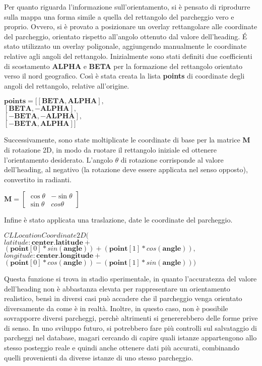 Per quanto riguarda l'informazione sull'orientamento, si è pensato di riprodurre 
sulla mappa una forma simile a quella del rettangolo del parcheggio vero e 
proprio. Ovvero, si è provato a posizionare un overlay rettangolare alle coordinate
del parcheggio, orientato rispetto all'angolo ottenuto dal valore dell'heading. 
\'E stato utilizzato un overlay poligonale, aggiungendo manualmente le coordinate
relative agli angoli del rettangolo. Inizialmente sono stati definiti due coefficienti 
di scostamento \textbf{ALPHA} e \textbf{BETA} per la formazione del rettangolo orientato 
verso il nord geografico. Così è stata creata la lista \textbf{points} di coordinate degli
angoli del rettangolo, relative all'origine. 
\begin{center}
    $ \textbf{points} = [[\textbf{BETA}, \textbf{ALPHA}],$\\
        $[\textbf{BETA}, -\textbf{ALPHA}],$\\
        $[-\textbf{BETA}, -\textbf{ALPHA}],$\\
        $[-\textbf{BETA}, \textbf{ALPHA}]] $
\end{center}
Successivamente, sono state moltiplicate le coordinate di base per la matrice \textbf{M} 
di rotazione 2D, in modo da ruotare il rettangolo iniziale ed ottenere 
l'orientamento desiderato. L'angolo $\theta$ di rotazione corrisponde al valore dell'heading, al negativo (la 
rotazione deve essere applicata nel senso opposto), convertito in radianti. 
\begin{center}
    $\textbf{M} = \begin{bmatrix}
        \cos{\theta} & -\sin{\theta}\\
        \sin{\theta} & cos{\theta}
    \end{bmatrix}$
\end{center}
Infine è stato applicata una traslazione, date le coordinate del parcheggio.
\begin{center}
    $CLLocationCoordinate2D($\\
    $latitude: \textbf{center.latitude} + $ \\
    $(\textbf{point}[0] * sin(\textbf{angle})) + (\textbf{point}[1] * cos(\textbf{angle})),$\\
    $longitude: \textbf{center.longitude} + $ \\
    $(\textbf{point}[0] * cos(\textbf{angle})) - (\textbf{point}[1] * sin(\textbf{angle})))$
\end{center}
Questa funzione si trova in stadio sperimentale, in quanto l'accuratezza del valore
dell'heading non è abbastanza elevata per rappresentare un orientamento realistico, 
bensì in diversi casi può accadere che il parcheggio venga orientato diversamente 
da come è in realtà. Inoltre, in questo caso, non è possibile sovrapporre diversi
parcheggi, perchè altrimenti si genererebbero delle forme prive di senso. In uno 
sviluppo futuro, si potrebbero fare più controlli sul salvataggio di parcheggi nel
database, magari cercando di capire quali istanze appartengono allo stesso posteggio
reale e quindi anche ottenere dati più accurati, combinando quelli provenienti da 
diverse istanze di uno stesso parcheggio.

